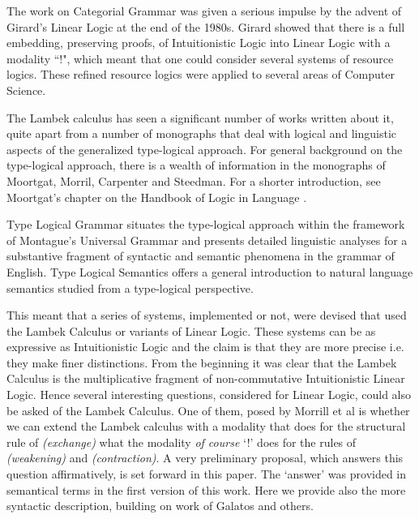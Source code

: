 \documentclass{article}
\begin{document}
The work on Categorial Grammar was given a serious impulse by the
advent of Girard's Linear Logic at the end of the 1980s.  Girard
showed that there is a full embedding, preserving proofs, of
Intuitionistic Logic into Linear Logic with a modality ``!", which
meant that one could consider several systems of resource
logics. These refined resource logics were applied to several areas of
Computer Science.

The Lambek calculus has seen a significant number of works written
about it, quite apart from a number of monographs that deal with
logical and linguistic aspects of the generalized type-logical
approach.  For general background on the type-logical approach, there
is a wealth of information in the monographs of Moortgat, Morril,
Carpenter and Steedman. For a shorter introduction, see
Moortgat's chapter on the Handbook of Logic in Language \cite{?}.

Type Logical Grammar situates the type-logical approach within the
framework of Montague's Universal Grammar and presents detailed
linguistic analyses for a substantive fragment of syntactic and
semantic phenomena in the grammar of English.  Type Logical Semantics
offers a general introduction to natural language semantics studied
from a type-logical perspective.



This meant that a series of systems, implemented or not, were devised
that used the Lambek Calculus or variants of Linear Logic. These
systems can be as expressive as Intuitionistic Logic and the claim is
that they are more precise i.e. they make finer distinctions.  From
the beginning it was clear that the Lambek Calculus is the
multiplicative fragment of non-commutative Intuitionistic Linear
Logic.  Hence several interesting questions, considered for Linear
Logic, could also be asked of the Lambek Calculus.  One of them, posed
by Morrill et al is whether we can extend the Lambek calculus with a
modality that does for the structural rule of \textit{(exchange)} what
the modality \textit{of course} `!' does for the rules of
\textit{(weakening)} and \textit{(contraction)}.  A very preliminary
proposal, which answers this question affirmatively, is set forward in
this paper. The `answer' was provided in semantical terms in the first
version of this work. Here we provide also the more syntactic
description, building on work of Galatos and others.
\end{document}

